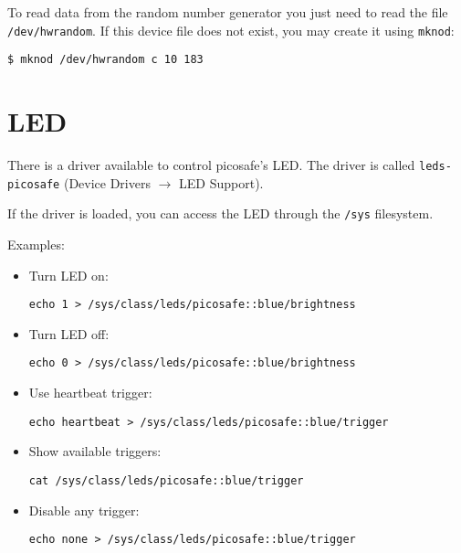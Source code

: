 To read data from the random number generator you just need to read the file
\texttt{/dev/hwrandom}. If this device file does not exist, you may create it
using \texttt{mknod}:

\texttt{\$ mknod /dev/hwrandom c 10 183}

\section{LED}

There is a driver available to control picosafe's LED. The driver is called
\texttt{leds-picosafe} (Device Drivers $\rightarrow$ LED Support).

If the driver is loaded, you can access the LED through the \texttt{/sys}
filesystem.

Examples:
\begin{itemize}
\item Turn LED on:

\texttt{echo 1 > /sys/class/leds/picosafe::blue/brightness}
\item Turn LED off:

\texttt{echo 0 > /sys/class/leds/picosafe::blue/brightness}

\item Use heartbeat trigger:

\texttt{echo heartbeat > /sys/class/leds/picosafe::blue/trigger}

\item Show available triggers:

\texttt{cat /sys/class/leds/picosafe::blue/trigger}

\item Disable any trigger:

\texttt{echo none > /sys/class/leds/picosafe::blue/trigger}
\end{itemize}

% 
% 
% 
% 
% 
% 
% 
